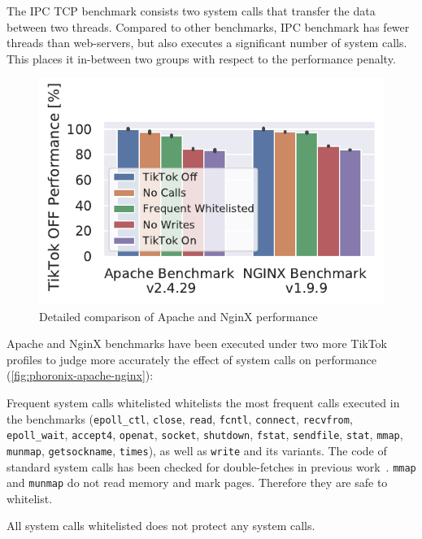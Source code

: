 \documentclass[conference]{IEEEtran}
\newcommand{\sysname}{TikTok}
\begin{document}
The IPC TCP benchmark consists two system calls that transfer the data between
two threads. Compared to other benchmarks, IPC benchmark has fewer threads than
web-servers, but also executes a significant number of system calls. This places
it in-between two groups with respect to the performance penalty.

\begin{figure}[]
  \centering
  \includegraphics[width=\linewidth]{img/freq_removed.pdf}
  \caption{Detailed comparison of Apache and NginX performance}
  \label{fig:phoronix-apache-nginx}
\end{figure}

Apache and NginX benchmarks have been executed under two more \sysname{}
profiles to judge more accurately the effect of system calls on performance
(\autoref{fig:phoronix-apache-nginx}):

\begin{LaTeXdescription}
  \item[Frequent system calls whitelisted] whitelists the most frequent calls
  executed in the benchmarks (\texttt{epoll\_ctl}, \texttt{close},
  \texttt{read}, \texttt{fcntl}, \texttt{connect}, \texttt{recvfrom},
  \texttt{epoll\_wait}, \texttt{accept4}, \texttt{openat}, \texttt{socket},
  \texttt{shutdown}, \texttt{fstat}, \texttt{sendfile}, \texttt{stat},
  \texttt{mmap}, \texttt{munmap}, \texttt{getsockname}, \texttt{times}), as well
  as \texttt{write} and its variants. The code of standard system calls has been
  checked for double-fetches in previous work~\cite{wang2017double,
  xu2018precise}. \texttt{mmap} and \texttt{munmap} do not read memory and mark
  pages. Therefore they are safe to whitelist.


  \item[All system calls whitelisted] does not protect any system calls.
\end{LaTeXdescription}
\end{document}
